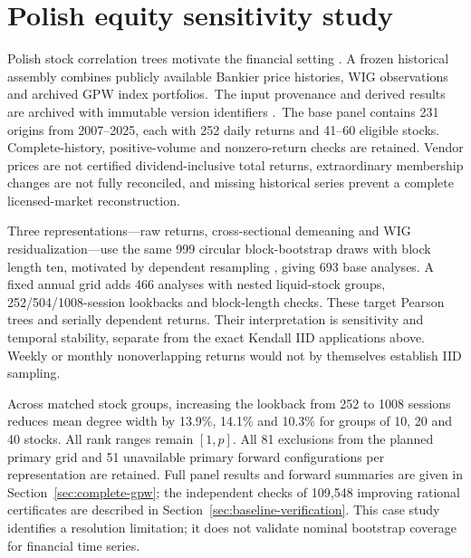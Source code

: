 \section{Polish equity sensitivity study}\label{sec:gpw}
Polish stock correlation trees motivate the financial setting \citep{galazka2011}. A frozen historical assembly combines publicly available Bankier price histories, WIG observations and archived GPW index portfolios.\ifanonymous\else\ The input provenance and derived results are archived with immutable version identifiers \citep{previouscode}.\fi\ The base panel contains 231 origins from 2007--2025, each with 252 daily returns and 41--60 eligible stocks. Complete-history, positive-volume and nonzero-return checks are retained. Vendor prices are not certified dividend-inclusive total returns, extraordinary membership changes are not fully reconciled, and missing historical series prevent a complete licensed-market reconstruction.

Three representations---raw returns, cross-sectional demeaning and WIG residualization---use the same 999 circular block-bootstrap draws with block length ten, motivated by dependent resampling \citep{kunsch1989}, giving 693 base analyses. A fixed annual grid adds 466 analyses with nested liquid-stock groups, 252/504/1008-session lookbacks and block-length checks. These target Pearson trees and serially dependent returns. Their interpretation is sensitivity and temporal stability, separate from the exact Kendall IID applications above. Weekly or monthly nonoverlapping returns would not by themselves establish IID sampling.

Across matched stock groups, increasing the lookback from 252 to 1008 sessions reduces mean degree width by 13.9\%, 14.1\% and 10.3\% for groups of 10, 20 and 40 stocks. All rank ranges remain $[1,p]$. All 81 exclusions from the planned primary grid and 51 unavailable primary forward configurations per representation are retained. Full panel results and forward summaries are given in Section~\ref{sec:complete-gpw}; the independent checks of 109,548 improving rational certificates are described in Section~\ref{sec:baseline-verification}. This case study identifies a resolution limitation; it does not validate nominal bootstrap coverage for financial time series.
